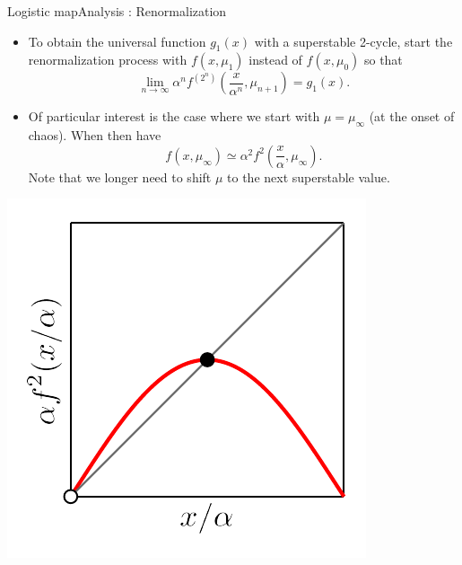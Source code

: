 \documentclass[usenames,dvipsnames,svgnames,10pt,aspectratio=169]{beamer}
\begin{document}
\begin{frame}[t, c]{Logistic map}{Analysis : Renormalization}
	\begin{minipage}{.68\textwidth}
		\begin{itemize}
			\item To obtain the universal function \(g_1(x)\) with a superstable 2-cycle, start the renormalization process with \(f(x, \mu_1)\) instead of \(f(x, \mu_0)\) so that
			\[
				\lim_{n \to \infty} \alpha^n f^{(2^n)} \left( \frac{x}{\alpha^n}, \mu_{n+1} \right) = g_1(x).
			\]
			\item Of particular interest is the case where we start with \( \mu = \mu_{\infty} \) (at the onset of chaos). When then have
			\[
				f(x, \mu_{\infty}) \simeq \alpha^2 f^2 \left( \frac{x}{\alpha}, \mu_{\infty} \right).
			\]
			Note that we longer need to shift \( \mu \) to the next superstable value.
		\end{itemize}
	\end{minipage}%
	\hfill
	\begin{minipage}{.28\textwidth}
		\centering
		\includegraphics[width=\textwidth]{renormalization_3}
	\end{minipage}

	\vspace{1cm}
\end{frame}
\end{document}
